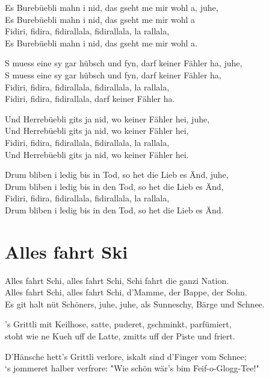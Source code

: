 \documentclass[
  letterpaper,
]{scrbook}
\begin{document}
Es Burebüebli mahn i nid, das gseht me mir wohl a, juhe,\\
Es Burebüebli mahn i nid, das gseht me mir wohl a\\
Fidiri, fidira, fidirallala, fidirallala, la rallala,\\
Es Burebüebli mahn i nid, das gseht me mir wohl a.

S muess eine sy gar hübsch und fyn, darf keiner Fähler ha, juhe,\\
S muess eine sy gar hübsch und fyn, darf keiner Fähler ha,\\
Fidiri, fidira, fidirallala, fidirallala, la rallala,\\
Fidiri, fidira, fidirallala, darf keiner Fähler ha.

Und Herrebüebli git\textquotesingle s ja nid, wo keiner Fähler hei,
juhe,\\
Und Herrebüebli git\textquotesingle s ja nid, wo keiner Fähler hei,\\
Fidiri, fidira, fidirallala, fidirallala, la rallala,\\
Und Herrebüebli git\textquotesingle s ja nid, wo keiner Fähler hei.

Drum bliben i ledig bis in Tod, so het die Lieb es Änd, juhe,\\
Drum bliben i ledig bis in den Tod, so het die Lieb es Änd,\\
Fidiri, fidira, fidirallala, fidirallala, la rallala,\\
Drum bliben i ledig bis in den Tod, so het die Lieb es Änd.

\hypertarget{alles-fahrt-ski}{%
\chapter{Alles fahrt Ski}\label{alles-fahrt-ski}}

Alles fahrt Schi, alles fahrt Schi, Schi fahrt die ganzi Nation.\\
Alles fahrt Schi, alles fahrt Schi, d'Mamme, der Bappe, der Sohn.\\
Es git halt nüt Schöners, juhe, juhe, als Sunneschy, Bärge und Schnee.

's Grittli mit Keilhose, satte, puderet, gschminkt, parfümiert,\\
stoht wie ne Kueh uff de Latte, zmitts uff der Piste und friert.

D'Hänsche hett's Grittli verlore, iskalt sind d'Finger vom Schnee;\\
`s jommeret halber verfrore: "Wie schön wär's bim Feif-o-Glogg-Tee!"
\end{document}
